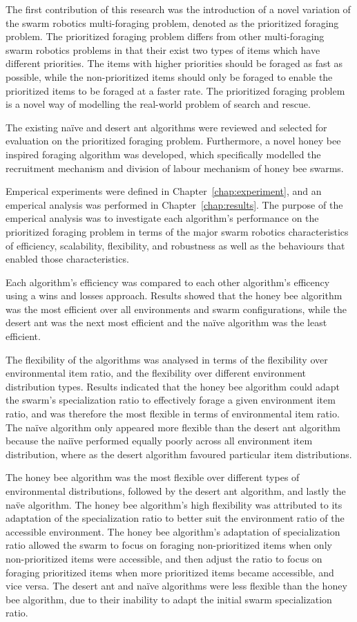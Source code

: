 The first contribution of this research was the introduction of a novel variation of the swarm robotics multi-foraging problem, denoted as the prioritized foraging problem. The prioritized foraging problem differs from other multi-foraging swarm robotics problems in that their exist two types of items which have different priorities. The items with higher priorities should be foraged as fast as possible, while the non-prioritized items should only be foraged to enable the prioritized items to be foraged at a faster rate. The prioritized foraging problem is a novel way of modelling the real-world problem of search and rescue.  

The existing na\"ive and desert ant algorithms were reviewed and selected for evaluation on the prioritized foraging problem. Furthermore, a novel honey bee inspired foraging algorithm was developed, which specifically modelled the recruitment mechanism and division of labour mechanism of honey bee swarms.

Emperical experiments were defined in Chapter~\ref{chap:experiment}, and an emperical analysis was performed in Chapter~\ref{chap:results}. The purpose of the emperical analysis was to investigate each algorithm's performance on the prioritized foraging problem in terms of the major swarm robotics characteristics of efficiency, scalability, flexibility, and robustness as well as the behaviours that enabled those characteristics. 

Each algorithm's efficiency was compared to each other algorithm's efficency using a wins and losses approach. Results showed that the honey bee algorithm was the most efficient over all environments and swarm configurations, while the desert ant was the next most efficient and the na\"ive algorithm was the least efficient.

The flexibility of the algorithms was analysed in terms of the flexibility over environmental item ratio, and the flexibility over different environment distribution types. Results indicated that the honey bee algorithm could adapt the swarm's specialization ratio to effectively forage a given environment item ratio, and was therefore the most flexible in terms of environmental item ratio. The na\"ive algorithm only appeared more flexible than the desert ant algorithm because the nai\"ive performed equally poorly across all environment item distribution, where as the desert algorithm favoured particular item distributions.

The honey bee algorithm was the most flexible over different types of environmental distributions, followed by the desert ant algorithm, and lastly the na\"ve algorithm. The honey bee algorithm's high flexibility was attributed to its adaptation of the specialization ratio to better suit the environment ratio of the accessible environment. The honey bee algorithm's adaptation of specialization ratio allowed the swarm to focus on foraging non-prioritized items when only non-prioritized items were accessible, and then adjust the ratio to focus on foraging prioritized items when more prioritized items became accessible, and vice versa. The desert ant and na\"ive algorithms were less flexible than the honey bee algorithm, due to their inability to adapt the initial swarm specialization ratio.

